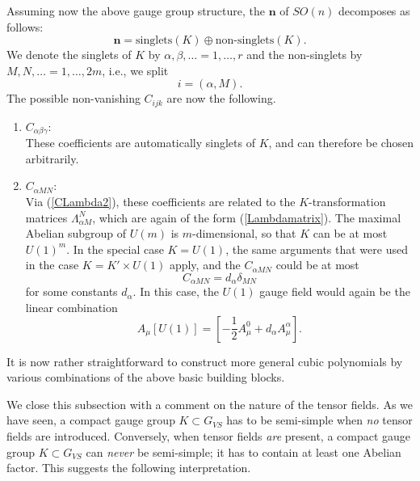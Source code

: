 \documentclass[a4paper,11pt]{article}
\begin{document}
Assuming now the above gauge group structure,
the $\mathbf{n}$ of $SO(n)$ decomposes as follows:
\begin{displaymath}
    \mathbf{n}=\textrm{singlets}(K)\oplus
    \textrm{non-singlets}(K).
\end{displaymath}
We denote the singlets of $K$ by $\alpha,\beta,\ldots=1,\ldots,r$ and
the non-singlets by $M,N,\ldots =1,\ldots, 2m$, i.e., we split
\begin{displaymath}
    i=(\alpha,M).
\end{displaymath}
The possible non-vanishing $C_{ijk}$ are now the following.
\begin{enumerate}
\item $C_{\alpha\beta\gamma}$:\\
These coefficients are automatically singlets of $K$, and can
therefore be chosen arbitrarily.

\item $C_{\alpha MN}$:\\
Via (\ref{CLambda2}), these
coefficients are related to the $K$-transformation
matrices $\Lambda_{\alpha M}^{N}$, which are again of the
form (\ref{Lambdamatrix}). The maximal Abelian subgroup of $U(m)$
is $m$-dimensional, so that $K$ can be at most $U(1)^{m}$. In the
special case $K=U(1)$, the same arguments that were used in the
case $K=K'\times U(1)$ apply, and the $C_{\alpha MN}$ could be at
most
\begin{displaymath}
    C_{\alpha MN}=d_{\alpha}\delta_{MN}
\end{displaymath}
for some constants $d_{\alpha}$. In this case, the $U(1)$ gauge
field would again be the linear combination
\begin{displaymath}
A_{\mu}[U(1)]=\left[-\frac{1}{2}A_{\mu}^{0}+d_{\alpha}
        A_{\mu}^{\alpha}\right].
\end{displaymath}




\end{enumerate}

It is now rather straightforward to construct more general cubic
polynomials by various combinations of the above basic building
blocks.


We close this subsection with a comment on the nature of the tensor
fields. As we have seen, a compact gauge
group $K\subset G_{VS}$ has to be semi-simple when \emph{no} tensor fields
are introduced. Conversely, when tensor fields \emph{are} present, a
compact gauge group $K\subset G_{VS}$ can \emph{never} be semi-simple; it
has to contain at least one Abelian factor.  This suggests the following
interpretation.
\end{document}
